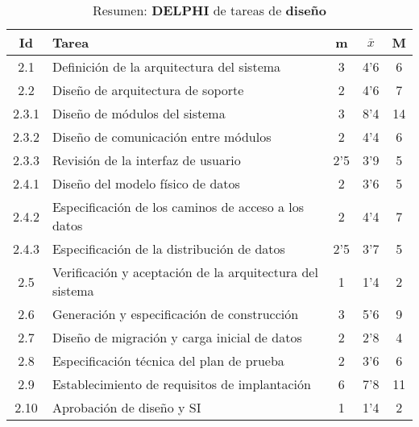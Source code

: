 \documentclass[11pt,a4paper,spanish,twoside]{report}
\begin{document}
\begin{table}[!h]
\centering
  \begin{tabular}{|c||p{8cm}||c|c|c|}
    \hline
    \textbf{Id} & \textbf{Tarea} & \textbf{m} & 
    \textbf{$\bar{x}$} &\textbf{M} \\
    \hline
    2.1 & Definición de la arquitectura del sistema & 3 & 4'6 & 6 \\
    \hline
    2.2 & Diseño de arquitectura de soporte & 2 & 4'6 & 7 \\
    \hline
    2.3.1 & Diseño de módulos del sistema & 3 & 8'4 & 14 \\
    \hline
    2.3.2 & Diseño de comunicación entre módulos & 2 & 4'4 & 6 \\
    \hline
    2.3.3 & Revisión de la interfaz de usuario &2'5 & 3'9 & 5 \\
    \hline
    2.4.1 & Diseño del modelo físico de datos & 2 & 3'6 & 5 \\
    \hline
    2.4.2 & Especificación de los caminos de acceso a los datos & 2 & 4'4 & 7\\
    \hline
    2.4.3 & Especificación de la distribución de datos & 2'5 & 3'7 & 5 \\
    \hline
    2.5 & Verificación y aceptación de la arquitectura del sistema & 1 & 1'4
    & 2 \\
    \hline
    2.6 & Generación y especificación de construcción & 3 & 5'6 & 9 \\
    \hline
    2.7 & Diseño de migración y carga inicial de datos & 2 & 2'8 & 4 \\
    \hline
    2.8 & Especificación técnica del plan de prueba & 2 & 3'6 & 6 \\
    \hline
    2.9 & Establecimiento de requisitos de implantación & 6 & 7'8 & 11 \\
    \hline
    2.10 & Aprobación de diseño y SI & 1 & 1'4 & 2 \\
    \hline
  \end{tabular}
  \caption{Resumen: \textbf{DELPHI} de tareas de \textbf{diseño}}
  \label{Tab:rDELPHIdis}
\end{table}
\end{document}
